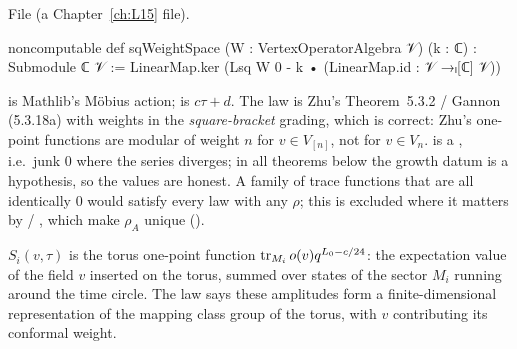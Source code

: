 \noindent File  (a Chapter~\ref{ch:L15} file).
\begin{leancode}
noncomputable def sqWeightSpace (W : VertexOperatorAlgebra 𝒱) (k : ℂ) : Submodule ℂ 𝒱 :=
  LinearMap.ker (Lsq W 0 - k • (LinearMap.id : 𝒱 →ₗ[ℂ] 𝒱))
\end{leancode}
\begin{dictionary}
 is Mathlib's Möbius action;  is $c\tau+d$. The law is Zhu's Theorem~5.3.2 / Gannon (5.3.18a)
with weights in the \emph{square-bracket} grading, which is correct: Zhu's one-point functions are modular of weight $n$ for
$v\in V_{[n]}$, not for $v\in V_n$.  is a , i.e.\ junk $0$ where the series diverges; in all
theorems below the growth datum  is a hypothesis, so the values are honest. A family of trace functions
that are all identically $0$ would satisfy every law with any $\rho$; this is excluded where it matters by
 / , which make $\rho_A$ unique ().
\end{dictionary}
\begin{physics}
$S_i(v,\tau)$ is the torus one-point function $\operatorname{tr}_{M_i}o(v)q^{L_0-c/24}$: the expectation value of the field $v$ inserted
on the torus, summed over states of the sector $M_i$ running around the time circle. The law says these amplitudes form a
finite-dimensional representation of the mapping class group of the torus, with $v$ contributing its conformal weight.
\end{physics}

